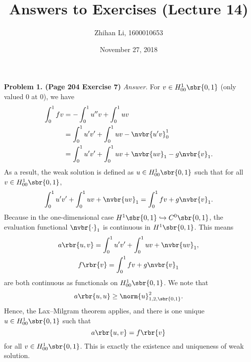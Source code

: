 \documentclass[english, nochinese]{pnote}
\title{Answers to Exercises (Lecture 14)}
\author{Zhihan Li, 1600010653}
\date{November 27, 2018}
\begin{document}
\maketitle

\textbf{Problem 1. (Page 204 Exercise 7)} \textit{Answer.} For $ v \in H^1_{ 0 0 } \sbr{ 0, 1 } $ (only valued $0$ at $0$), we have
\begin{equation}
\begin{split}
\int_0^1 f v &= -\int_0^1 u'' v + \int_0^1 u v \\
&= \int_0^1 u' v' + \int_0^1 u v - \nvbr{ u' v }_0^1 \\
&= \int_0^1 u' v' + \int_0^1 u v + \nvbr{ u v }_1 - g \nvbr{v}_1.
\end{split}
\end{equation}
As a result, the weak solution is defined as $ u \in H^1_{ 0 0 } \sbr{ 0, 1 } $ such that for all $ v \in H^1_{ 0 0 } \sbr{ 0, 1 } $,
\begin{equation}
\int_0^1 u' v' + \int_0^1 u v + \nvbr{ u v }_1 = \int_0^1 f v + g \nvbr{v}_1.
\end{equation}
Because in the one-dimensional case $ H^1 \sbr{ 0, 1 } \hookrightarrow C^0 \sbr{ 0, 1 } $, the evaluation functional $\nvbr{\cdot}_1$ is continuous in $ H^1 \sbr{ 0, 1 } $. This means
\begin{gather}
a \rbr{ u, v } = \int_0^1 u' v' + \int_0^1 u v + \nvbr{ u v }_1, \\
f \rbr{v} = \int_0^1 f v + g \nvbr{v}_1
\end{gather}
are both continuous as functionals on $ H^1_{ 0 0 } \sbr{ 0, 1 } $. We note that
\begin{equation}
a \rbr{ u, u } \ge \norm{u}_{ 1, 2, \sbr{ 0, 1 } }^2.
\end{equation}
Hence, the Lax--Milgram theorem applies, and there is one unique $ u \in H^1_{ 0 0 } \sbr{ 0, 1 } $ such that
\begin{equation}
a \rbr{ u, v } = f \rbr{v}
\end{equation}
for all $ v \in H^1_{ 0 0 } \sbr{ 0, 1 } $. This is exactly the existence and uniqueness of weak solution.
\end{document}
